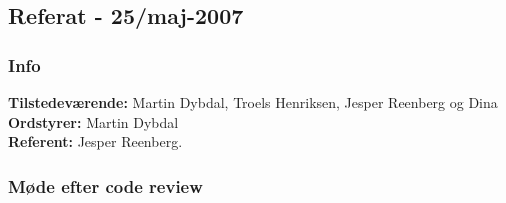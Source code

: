\subsection{Referat - 25/maj-2007}

\subsubsection{Info}

\textbf{Tilstedeværende:} Martin Dybdal, Troels Henriksen, Jesper Reenberg og Dina\\
\textbf{Ordstyrer:} Martin Dybdal\\
\textbf{Referent:} Jesper Reenberg.

\subsubsection{Møde efter code review}

